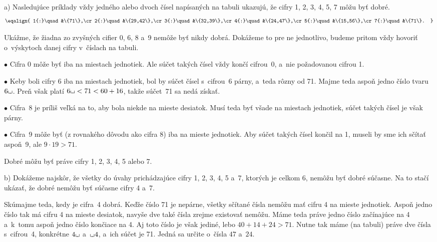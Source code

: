 {%
a) Nasledujúce príklady vždy jedného alebo dvoch
čísel napísaných na tabuli ukazujú, že cifry 1, 2, 3, 4, 5,
7 môžu byť dobré.
$$
\eqalign{
1{:}\quad &\{71\},\cr
2{:}\quad &\{29,42\},\cr
3{:}\quad &\{32,39\},\cr
4{:}\quad &\{24,47\},\cr
5{:}\quad &\{15,56\},\cr
7{:}\quad &\{71\}.
}$$

\def\van{{\llcorner\mskip-6mu\lrcorner}}
Ukážme, že žiadna zo zvyšných cifier 0, 6, 8 a~9 nemôže byť nikdy
dobrá. Dokážeme to pre ne jednotlivo, budeme pritom vždy hovoriť
o~výskytoch danej cifry v~číslach na tabuli.
\item{$\bullet$} Cifra 0 môže byť iba na miestach jednotiek. Ale súčet takých čísel vždy končí cifrou~0, a~nie požadovanou cifrou 1.
\item{$\bullet$} Keby boli cifry 6 iba na miestach jednotiek, bol by súčet čísel s~cifrou~6 párny, a~teda rôzny od 71. Majme teda aspoň jedno číslo tvaru $6\van$. Preň však platí $6\van<71<60+16$, takže súčet~71 sa nedá získať.
\item{$\bullet$} Cifra~8 je príliš veľká na to, aby bola niekde na mieste desiatok. Musí teda byť všade na miestach jednotiek, súčet takých čísel je však párny.
\item{$\bullet$} Cifra~9 môže byť (z rovnakého dôvodu ako cifra 8) iba na mieste jednotiek. Aby súčet takých čísel končil na 1, museli by sme ich sčítať aspoň~9, ale $9\cdot19>71$.

\zaver
Dobré môžu byť práve cifry 1, 2, 3, 4, 5 alebo 7.

\bigskip
b) Dokážeme najskôr, že všetky do úvahy prichádzajúce cifry
1, 2, 3, 4, 5 a~7, ktorých je celkom 6, nemôžu byť dobré súčasne.
Na to stačí ukázať, že dobré nemôžu byť súčasne cifry 4 a~7.

Skúmajme teda, kedy je cifra~4 dobrá. Keďže číslo 71 je
nepárne, všetky sčítané čísla nemôžu mať cifru 4 na mieste
jednotiek. Aspoň jedno číslo tak má cifru 4 na mieste
desiatok, navyše dve také čísla zrejme existovať nemôžu. Máme
teda práve jedno číslo začínajúce na 4 a~k~tomu aspoň
jedno číslo končiace na 4. Aj toto číslo je však jediné, lebo
$40+14+24>71$. Nutne tak máme (na tabuli) práve dve čísla s~cifrou~4,
konkrétne $4\van$ a~$\van4$, a~ich súčet je 71. Jedná sa určite o~čísla $47$
a~$24$.

}
